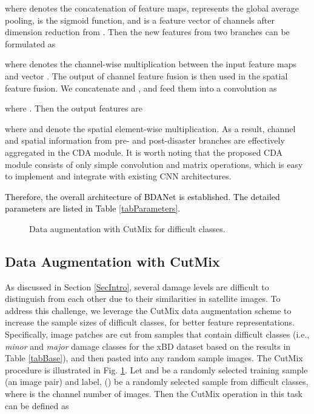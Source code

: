 \documentclass[journal]{IEEEtran}
\begin{document}
where  denotes the concatenation of feature maps,  represents the global average pooling,   is the sigmoid function, and 
is a feature vector of  channels after dimension reduction from . Then the new features from two branches can be formulated as

where  denotes the channel-wise multiplication between the input feature maps and vector . The output of channel feature fusion is then used in the spatial feature fusion. We concatenate  and , and feed them into a  convolution  as

where .
Then the output features are 

where  and  denote the spatial element-wise multiplication. As a result, channel and spatial information from pre- and post-disaster branches are effectively aggregated in the CDA module.
It is  worth noting that the proposed CDA module consists of only simple convolution and matrix operations, which is easy to implement and integrate with existing CNN architectures. 

\textcolor{black}{Therefore, the overall architecture of BDANet is established. The detailed parameters are listed in Table \ref{tabParameters}.}

\begin{figure}[h]
	\centering
	\caption{Data augmentation with CutMix for difficult classes.}
	\label{figCutmix}
\end{figure}

\subsection{Data Augmentation with CutMix} 
As discussed in Section \ref{SecIntro}, several damage levels are difficult to distinguish from each other due to their similarities in satellite images. To address this challenge, we leverage the CutMix \cite{yun2019cutmix} data augmentation scheme to increase the sample sizes of difficult classes, for better feature representations.  
Specifically, image patches are cut from samples that contain difficult classes (i.e., \textit{minor} and \textit{major} damage classes for the xBD dataset based on the results in Table \ref{tabBase}), and then pasted into any random sample images. The CutMix procedure is illustrated in Fig. \ref{figCutmix}. Let  and  be a randomly selected training sample (an image pair) and label, () be a randomly selected sample from difficult classes, where  is the channel number of images. Then the CutMix operation in this task can be defined as
\end{document}
